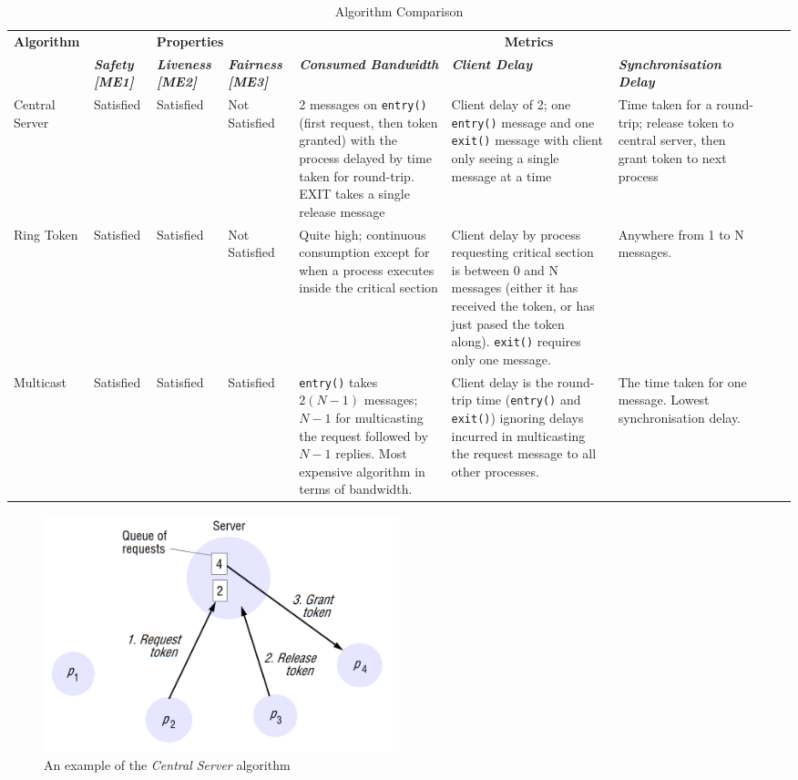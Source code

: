 \documentclass[conference]{IEEEtran}
\begin{document}
\begin{table}[t]
\caption{Algorithm Comparison}
\begin{center}
  \begin{tabular}{|p{2cm}|p{1cm}|p{1cm}|p{1.5cm}|p{3.5cm}|p{3cm}|p{3cm}|p{3cm}|p{10cm}|}
\hline
  \textbf{Algorithm} &
  \multicolumn{3}{c}{\textbf{Properties}} &
  \multicolumn{3}{|c|}{\textbf{Metrics}} \\
  \cline{2-4}\cline{5-7}
    & \textbf{\textit{Safety [ME1]}}& \textbf{\textit{Liveness [ME2]}}&
    \textbf{\textit{Fairness [ME3]}}  
  & \textbf{\textit{Consumed Bandwidth}}& \textbf{\textit{Client Delay}}&
  \textbf{\textit{Synchronisation Delay}} \\
\hline
    Central Server & Satisfied & Satisfied & Not Satisfied & 2 messages on
    \texttt{entry()} (first request, then token granted) with the process delayed by time
    taken for round-trip. EXIT takes a single release message & Client delay of 2;
    one \texttt{entry()} message and one \texttt{exit()} message with client only seeing a single
    message at a time & Time taken for a round-trip; release token to central
    server, then grant token to next process  \\
  Ring Token & Satisfied & Satisfied & Not Satisfied & 
    Quite high; continuous consumption except for when a process executes inside the critical section &
    Client delay by process requesting critical section is between 0 and
    N messages (either it has received the token, or has just pased the token
    along). \texttt{exit()} requires only one message. & 
    Anywhere from 1 to N messages. \\
  Multicast & Satisfied & Satisfied & Satisfied & 
    \texttt{entry()} takes $2(N-1)$ messages; $N-1$ for multicasting the request followed by
    $N-1$ replies. Most expensive algorithm in terms of bandwidth. & 
    Client delay is the round-trip time (\texttt{entry()} and \texttt{exit()}) ignoring delays
    incurred in multicasting the request message to all other processes. & 
    The time taken for one message. Lowest synchronisation delay. \\
\hline
\end{tabular}
\label{tab:comparison}
\end{center}
\end{table}

\begin{figure}[htbp]
  \centerline{\includegraphics[width=0.5\textwidth]{central-server.png}}
  \caption{An example of the \textit{Central Server} algorithm}
\label{fig:central-server}
\end{figure}
\end{document}

